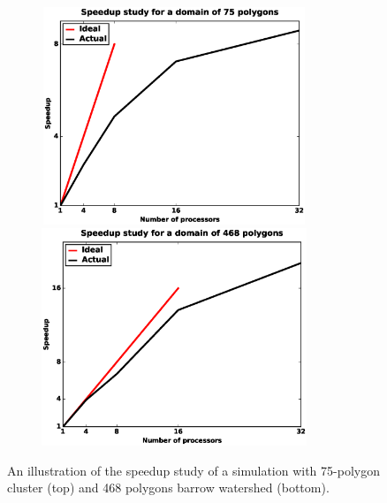 \documentclass[review]{elsarticle}
\begin{document}
\begin{figure}[!htpb]
\centering
\includegraphics[height = 6.5cm, width=10cm]{figures/speedup-lcs-lobster.eps}
\includegraphics[height = 6.5cm, width=10cm]{figures/speedup-lcs-barrow.eps}
\caption{An illustration of the speedup study of a simulation with 75-polygon cluster (top) and 468 polygons barrow watershed (bottom).}
\label{lcs-speed}
\end{figure}
\end{document}
